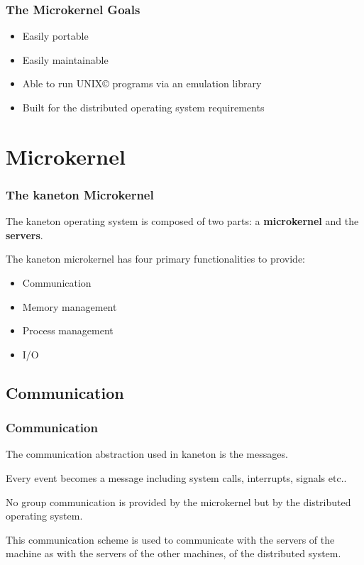 \documentclass[8pt]{beamer}
\newcommand{\nl}[0]{\vspace{0.4cm}}
\begin{document}

\begin{frame}
  \frametitle{The Microkernel Goals}

  \begin{itemize}[<+->]
    \item
      Easily portable
    \item
      Easily maintainable
    \item
      Able to run UNIX{\scriptsize \copyright} programs via
      an emulation library
    \item
      Built for the distributed operating system requirements
  \end{itemize}
\end{frame}

%
%

\section{Microkernel}


\begin{frame}
  \frametitle{The kaneton Microkernel}

  The kaneton operating system is composed of two parts: a
  \textbf{microkernel} and the \textbf{servers}.

  \nl

  The kaneton microkernel has four primary functionalities
  to provide:

  \begin{itemize}[<+->]
    \item
      Communication
    \item
      Memory management
    \item
      Process management
    \item
      I/O
  \end{itemize}
\end{frame}

%
%

\subsection{Communication}


\begin{frame}
  \frametitle{Communication}

  The communication abstraction used in kaneton is the messages.

  \nl

  Every event becomes a message including system calls, interrupts,
  signals etc..

  \nl

  No group communication is provided by the microkernel but by the distributed
  operating system.

  \nl

  This communication scheme is used to communicate with the servers
  of the machine as with the servers of the other machines, of
  the distributed system.
\end{frame}
\end{document}
